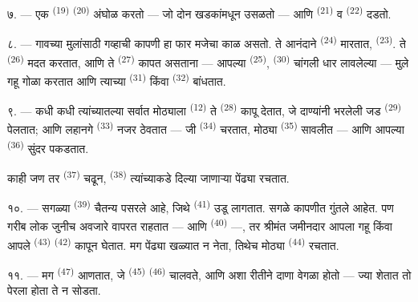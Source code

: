 ७. --- एक  \textsuperscript{(19)}  \textsuperscript{(20)} अंघोळ
करतो — जो दोन खडकांमधून उसळतो — आणि  \textsuperscript{(21)} व
 \textsuperscript{(22)} दडतो.

\VUsaut{5.0mm}
\VUsaut{3.4mm}

८. --- गावच्या मुलांसाठी गव्हाची कापणी हा फार मजेचा काळ असतो. ते आनंदाने 
\textsuperscript{(24)} मारतात,  \textsuperscript{(23)}. ते
 \textsuperscript{(26)} मदत करतात, आणि ते 
\textsuperscript{(27)} कापत असताना — आपल्या  \textsuperscript{(25)},
 \textsuperscript{(30)} चांगली धार लावलेल्या — मुले गहू गोळा करतात आणि
त्याच्या  \textsuperscript{(31)} किंवा  \textsuperscript{(32)}
बांधतात.

९. --- कधी कधी त्यांच्यातल्या सर्वात मोठ्याला  \textsuperscript{(12)} ते
 \textsuperscript{(28)} कापू देतात, जे दाण्यांनी भरलेली जड 
\textsuperscript{(29)} पेलतात; आणि लहानगे  \textsuperscript{(33)} नजर ठेवतात
— जी  \textsuperscript{(34)} चरतात, मोठ्या 
\textsuperscript{(35)} सावलीत — आणि आपल्या  \textsuperscript{(36)} सुंदर
 पकडतात.

काही जण तर  \textsuperscript{(37)} चढून, 
\textsuperscript{(38)} त्यांच्याकडे दिल्या जाणाऱ्या पेंढ्या रचतात.

१०. --- सगळ्या  \textsuperscript{(39)} चैतन्य पसरले आहे, जिथे 
\textsuperscript{(41)} उडू लागतात. सगळे कापणीत गुंतले आहेत. पण गरीब लोक जुनीच अवजारे वापरत
राहतात —  आणि  \textsuperscript{(40)} —, तर
श्रीमंत जमीनदार आपला गहू किंवा आपले  \textsuperscript{(43)}
 \textsuperscript{(42)} कापून घेतात. मग पेंढ्या खळ्यात न नेता,
तिथेच मोठ्या  \textsuperscript{(44)} रचतात.

११. --- मग  \textsuperscript{(47)} आणतात, जे 
\textsuperscript{(45)}  \textsuperscript{(46)} चालवते, आणि अशा रीतीने दाणा
 वेगळा होतो — ज्या शेतात तो पेरला होता ते न सोडता.

